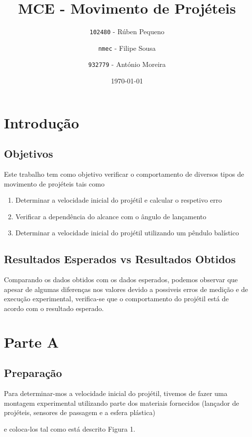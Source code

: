 \documentclass{report}
\title{MCE - Movimento de Projéteis}
\author{\texttt{102480} - Rúben Pequeno
\and 
\texttt{nmec} - Filipe Sousa
\and
\texttt{932779} - António Moreira}
\date{\today}
\begin{document}
\maketitle

\tableofcontents
\newpage

\chapter{Introdução}

\section{Objetivos}
	Este trabalho tem como objetivo verificar o comportamento de diversos tipos de movimento de projéteis tais como 
	\renewcommand{\theenumi}{\Alph{enumi}}
	\begin{enumerate}
		\item{Determinar a velocidade inicial do projétil e calcular o respetivo erro}
		\item{Verificar a dependência do alcance com o ângulo de lançamento}
		\item{Determinar a velocidade inicial do projétil utilizando um pêndulo balístico}
	\end{enumerate}


\section{Resultados Esperados vs Resultados Obtidos}
	Comparando os dados obtidos com os dados esperados, podemos observar que apesar de algumas
	diferenças nos valores devido a possiveis erros de medição e de execução experimental, verifica-se
	que o comportamento do projétil está de acordo com o resultado esperado.
	

\chapter{Parte A}

\section{Preparação}
	Para determinar-mos a velocidade inicial do projétil, tivemos de fazer uma montagem experimental
	 utilizando parte dos materiais fornecidos (lançador de projéteis, sensores de passagem e a esfera plástica) 
	 
	 e coloca-los tal como está descrito Figura 1.
\end{document}
